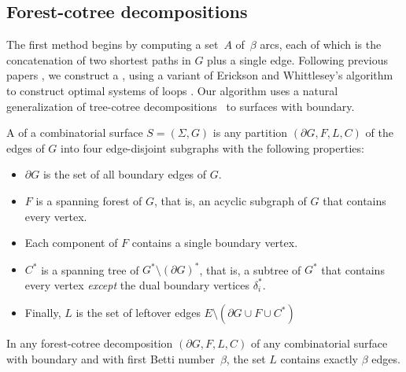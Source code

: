 \documentclass[letterpaper,review]{siamart190516}
\begin{document}
\subsection{Forest-cotree decompositions}
\label{sec:forest-cotree}

The first method begins by computing a set~$A$ of~$\beta$ arcs, each of which is the concatenation of two shortest paths in $G$ plus a single edge.
%
Following previous papers \cite{ccelw-scsih-08, ce-tnpcs-10, c-scgsp-10}, we construct a , using a variant of Erickson and Whittlesey's algorithm to construct optimal systems of loops \cite{ew-gohhg-05}.  Our algorithm uses a natural generalization of tree-cotree decompositions~\cite{e-dgteg-03} to surfaces with boundary.

A  of a combinatorial surface $S = (\Sigma, G)$ is any partition $(\partial\! G, F, L, C)$ of the edges of $G$ into four edge-disjoint subgraphs with the following properties:
\begin{itemize}\itemsep0pt
\item $\partial\! G$ is the set of all boundary edges of $G$.
\item $F$ is a spanning forest of $G$, that is, an acyclic subgraph of $G$ that contains every vertex.
\item Each component of $F$ contains a single boundary vertex.
\item $C^*$ is a spanning tree of $G^*\setminus (\partial G)^*$, that is, a subtree of $G^*$ that contains every vertex \emph{except} the dual boundary vertices $\delta_i^*$.
\item Finally, $L$ is the set of leftover edges $E \setminus (\partial\!G \cup F \cup C^*)$
\end{itemize}

\begin{lemma}
\label{lem:L_edges}
In any forest-cotree decomposition $(\partial\! G, F, L, C)$ of any combinatorial surface with boundary and with first Betti number~$\beta$, the set $L$ contains exactly $\beta$ edges.
\end{lemma}
\end{document}
